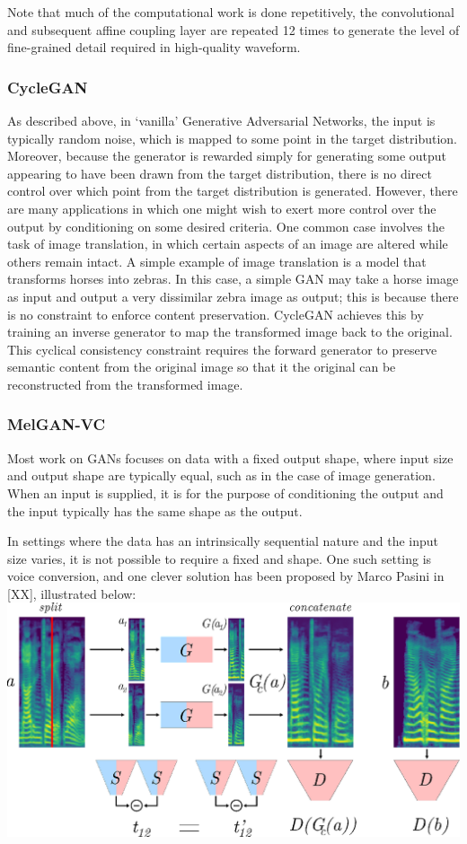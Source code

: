 Note that much of the computational work is done repetitively, the convolutional and subsequent 
affine coupling layer are repeated 12 times to generate the level of fine-grained detail 
required in high-quality waveform.


\subsubsection{CycleGAN}
As described above, in `vanilla' Generative Adversarial Networks, the input is typically random noise, which is mapped to some point in the 
target distribution. Moreover, because the generator is rewarded simply for generating some output 
appearing to have been drawn from the target distribution, there is no direct control over which 
point from the target distribution is generated.
However, there are many applications in which one might wish to exert more control over the output 
by conditioning on some desired criteria. One common case involves the task of image translation,
in which certain aspects of an image are altered while others remain intact. A simple example of 
image translation is a model that transforms horses into zebras. In this case, a simple GAN may take 
a horse image as input and output a very dissimilar zebra image as output; this is because there 
is no constraint to enforce content preservation.
CycleGAN \citep{} achieves this by training an inverse generator to map the transformed image back to the 
original. This cyclical consistency constraint requires the forward generator to preserve semantic 
content from the original image so that it the original can be reconstructed from the transformed image.

\subsubsection{MelGAN-VC}
Most work on GANs focuses on data with a fixed output shape, where 
input size and output shape are typically equal, such as in the case of image generation. 
When an input is supplied, it is for the purpose of conditioning the output and the input 
typically has the same shape as the output.

In settings where the data has an intrinsically sequential nature and the input size varies, 
it is not possible to require a fixed and shape. One such setting is voice conversion, and one 
clever solution has been proposed by Marco Pasini in [XX], illustrated below:\\
\includegraphics[width=\textwidth]{img/img_melganvc.png}

